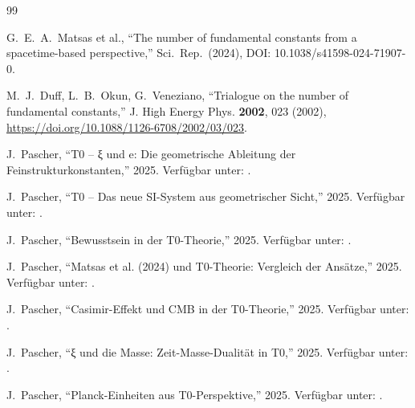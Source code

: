 \begin{thebibliography}{99}
	
	G.~E.~A.~Matsas et al.,
	``The number of fundamental constants from a spacetime-based perspective,''
	Sci.\ Rep.\ (2024), DOI: 10.1038/s41598-024-71907-0.
	
	M.~J.~Duff, L.~B.~Okun, G.~Veneziano,
	``Trialogue on the number of fundamental constants,''
	J. High Energy Phys. \textbf{2002}, 023 (2002),
	\url{https://doi.org/10.1088/1126-6708/2002/03/023}.
	
	J.~Pascher,
	``T0 – ξ und e: Die geometrische Ableitung der Feinstrukturkonstanten,''
	2025.
	Verfügbar unter:
	.
	
	J.~Pascher,
	``T0 – Das neue SI-System aus geometrischer Sicht,''
	2025.
	Verfügbar unter:
	.
	
	J.~Pascher,
	``Bewusstsein in der T0-Theorie,''
	2025.
	Verfügbar unter:
	.
	
	J.~Pascher,
	``Matsas et al. (2024) und T0-Theorie: Vergleich der Ansätze,''
	2025.
	Verfügbar unter:
	.
	
	J.~Pascher,
	``Casimir-Effekt und CMB in der T0-Theorie,''
	2025.
	Verfügbar unter:
	.
	
	J.~Pascher,
	``ξ und die Masse: Zeit-Masse-Dualität in T0,''
	2025.
	Verfügbar unter:
	.
	
	J.~Pascher,
	``Planck-Einheiten aus T0-Perspektive,''
	2025.
	Verfügbar unter:
	.
	
\end{thebibliography}